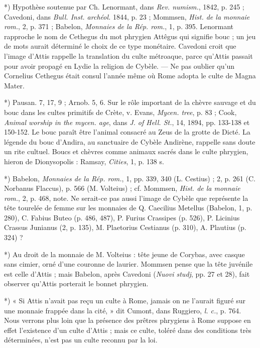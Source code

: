 \documentclass[a4paper, 11pt, oneside, polutonikogreek, french]{article}
\begin{document}
*) Hypothèse soutenue par Ch. Lenormant, dans \emph{Rev. numism.}, 1842, p. 245 ; Cavedoni, dans \emph{Bull. Inst. archéol.} 1844, p. 23 ; Mommsen, \emph{Hist. de la monnaie rom.}, 2, p. 371 ; Babelon, \emph{Monnaies de la Rép. rom.}, 1, p. 395. Lenormant rapproche le nom de Cethegus du mot phrygien Attêgus qui signifie bouc ; un jeu de mots aurait déterminé le choix de ce type monétaire. Cavedoni croit que l'image d'Attis rappelle la translation du culte métroaque, parce qu'Attis passait pour avoir propagé en Lydie la religion de Cybèle. --- Ne pas oublier qu'un Cornelius Cethegus était consul l'année même où Rome adopta le culte de Magna Mater.

*) Pausan. 7, 17, 9 ; Arnob. 5, 6. Sur le rôle important de la chèvre sauvage et du bouc dans les cultes primitifs de Crète, v. Evans, \emph{Mycen. tree}, p. 83 ; Cook, \emph{Animal worship in the mycen. age}, dans \emph{J. of Hell. St.}, 14, 1894, pp. 133-138 et 150-152. Le bouc paraît être l'animal consacré au Zeus de la grotte de Dicté. La légende du bouc d'Andira, au sanctuaire de Cybèle Andirène, rappelle sans doute un rite cultuel. Boucs et chèvres comme animaux sacrés dans le culte phrygien, hieron de Dionysopolis : Ramsay, \emph{Cities}, 1, p. 138 s.

*) Babelon, \emph{Monnaies de la Rép. rom.}, 1, pp. 339, 340 (L. Cestius) ; 2, p. 261 (C. Norbanus Flaccus), p. 566 (M. Volteius) ; cf. Mommsen, \emph{Hist. de la monnaie rom.}, 2, p. 468, note. Ne serait-ce pas aussi l'image de Cybèle que représente la tête tourelée de femme sur les monnaies de Q. Caecilius Metellus (Babelon, 1, p. 280), C. Fabius Buteo (p. 486, 487), P. Furius Crassipes (p. 526), P. Licinius Crassus Junianus (2, p. 135), M. Plaetorius Cestianus (p. 310), A. Plautius (p. 324) ?

*) Au droit de la monnaie de M. Volteius : tête jeune de Corybas, avec casque sans cimier, orné d'une couronne de laurier. Mommsen pense que la tête juvénile est celle d'Attis ; mais Babelon, après Cavedoni (\emph{Nuovi studj}, pp. 27 et 28), fait observer qu'Attis porterait le bonnet phrygien.

*) « Si Attis n'avait pas reçu un culte à Rome, jamais on ne l'aurait figuré sur une monnaie frappée dans la cité, » dit Cumont, dans Ruggiero, \emph{l. c.}, p. 764. Nous verrons plus loin que la présence des prêtres phrygiens à Rome suppose en effet l'existence d'un culte d'Attis ; mais ce culte, toléré dans des conditions très déterminées, n'est pas un culte reconnu par la loi.
\end{document}
